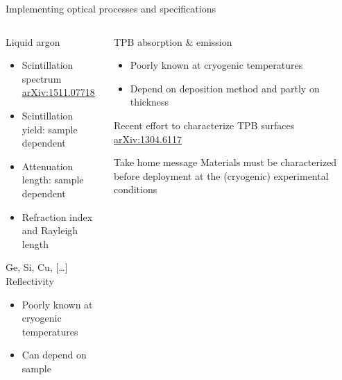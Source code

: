 \documentclass[10pt,aspectratio=169]{beamer}
\newcommand{\arxiv}[1]{\href{https://arxiv.org/abs/#1}{\smaller\ttfamily arXiv:#1}}
\begin{document}
\begin{frame}{Implementing optical processes and specifications}
  \begin{columns}
    \begin{column}{0.5\textwidth}
      \begin{exampleblock}{Liquid argon}
        \begin{itemize}
          \item Scintillation spectrum \arxiv{1511.07718}
          \item Scintillation yield: sample dependent
          \item Attenuation length: sample dependent
          \item Refraction index and Rayleigh length
        \end{itemize}
      \end{exampleblock}
      \begin{exampleblock}{Ge, Si, Cu, [\ldots] Reflectivity}
        \begin{itemize}
          \item Poorly known at cryogenic temperatures
          \item Can depend on sample
        \end{itemize}
      \end{exampleblock}
    \end{column}
    \begin{column}{0.5\textwidth}
      \begin{exampleblock}{TPB absorption \& emission}
        \begin{itemize}
          \item Poorly known at cryogenic temperatures
          \item Depend on deposition method and partly on thickness
        \end{itemize}
        Recent effort to characterize TPB surfaces \arxiv{1304.6117}
      \end{exampleblock}

      \begin{alertblock}{Take home message}
        Materials must be characterized before deployment at the (cryogenic)
        experimental conditions
      \end{alertblock}
    \end{column}
  \end{columns}
\end{frame}
\end{document}
